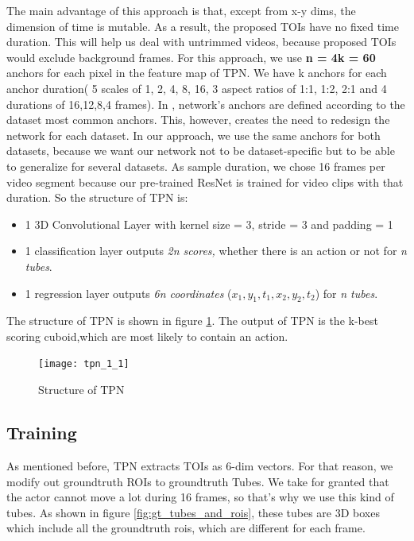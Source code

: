 The main advantage of this approach is that, except from x-y dims, the dimension of time is mutable. As a result, the proposed TOIs have
no fixed time duration. This will help us deal with untrimmed videos, because proposed TOIs would exclude background frames.
For this approach, we use \textbf{n = 4k = 60} anchors for each pixel in the feature map of TPN. We have k anchors for each anchor 
duration( 5 scales of 1, 2, 4, 8, 16, 3 aspect ratios of 1:1, 1:2, 2:1 and 4 durations of 16,12,8,4 frames).
In \cite{DBLP:journals/corr/HouCS17},  network's anchors are defined according to the dataset most common anchors. This, however,
creates the need to redesign the network for each dataset. In our approach, we use the same anchors for both datasets, because we want our network not
to be dataset-specific but to be able to generalize for several datasets. As sample duration, we chose 16 frames per video segment because
our pre-trained ResNet is trained for video clips with that duration.
So the structure of TPN is:
\begin{itemize}
\item 1 3D Convolutional Layer with kernel size = 3, stride = 3 and padding = 1
\item 1 classification layer outputs \textit{2n scores,} whether there is an action or not for \textit{n tubes}.
\item 1 regression layer outputs \textit{6n coordinates} ($x_1,y_1,t_1,x_2,y_2,t_2$) for \textit{n tubes}.
\end{itemize}

The structure of TPN is shown in figure \ref{fig:tpn_1_1}. The output of TPN is the k-best scoring cuboid,which are most likely to contain an action.
\begin{figure}[h]

  \texttt{[image: tpn\_1\_1]}
  \caption{Structure of TPN}
  \label{fig:tpn_1_1}
\end{figure}

\subsection{Training}
As mentioned before, TPN extracts TOIs as 6-dim vectors. For that reason, we modify out groundtruth ROIs to groundtruth Tubes.
We take for granted that the actor cannot move a lot during 16 frames, so that's why we use this kind of tubes. As shown 
in figure \ref{fig:gt_tubes_and_rois}, these tubes are 3D boxes which include all the groundtruth rois, which are different
for each frame.

